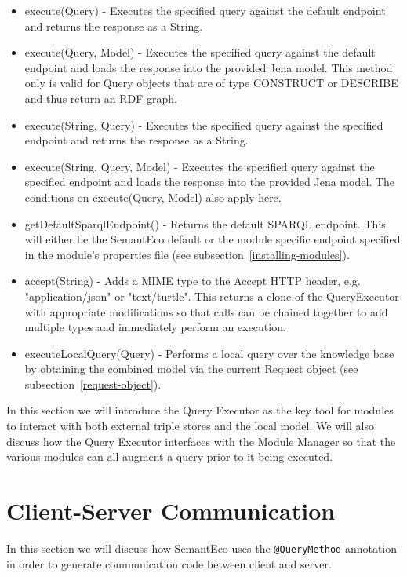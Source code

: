 \documentclass[letterpaper]{report}
\begin{document}
\begin{itemize}
\item execute(Query) - Executes the specified query against the default endpoint and returns the response as a String.
\item execute(Query, Model) - Executes the specified query against the default endpoint and loads the response into the provided Jena model. This method only is valid for Query objects that are of type CONSTRUCT or DESCRIBE and thus return an RDF graph.
\item execute(String, Query) - Executes the specified query against the specified endpoint and returns the response as a String.
\item execute(String, Query, Model) - Executes the specified query against the specified endpoint and loads the response into the provided Jena model. The conditions on execute(Query, Model) also apply here.
\item getDefaultSparqlEndpoint() - Returns the default SPARQL endpoint. This will either be the SemantEco default or the module specific endpoint specified in the module's properties file (see subsection~\ref{installing-modules}).
\item accept(String) - Adds a MIME type to the Accept HTTP header, e.g. "application/json" or "text/turtle". This returns a clone of the QueryExecutor with appropriate modifications so that calls can be chained together to add multiple types and immediately perform an execution.
\item executeLocalQuery(Query) - Performs a local query over the knowledge base by obtaining the combined model via the current Request object (see subsection~\ref{request-object}).
\end{itemize}

In this section we will introduce the Query Executor as the key tool for modules to interact with both external triple stores and the local model. We will also discuss how the Query Executor interfaces with the Module Manager so that the various modules can all augment a query prior to it being executed.

\section{Client-Server Communication}
\label{client-server-comm}
In this section we will discuss how SemantEco uses the \texttt{@QueryMethod} annotation in order to generate communication code between client and server. 
\end{document}
